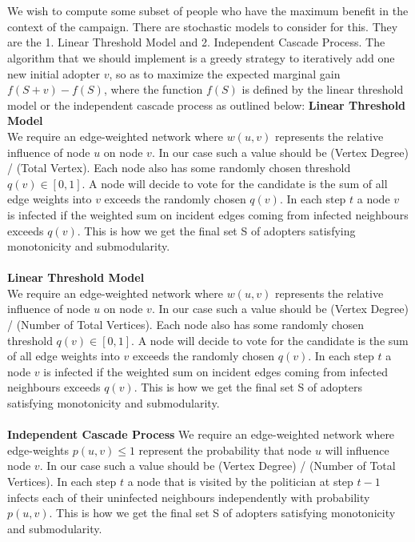 \documentclass[12pt]{article}
\begin{document}
\newpage
\section{}
We wish to compute some subset of people who have the maximum benefit in the context of the campaign. There are stochastic models to consider for this. They are the 1. Linear Threshold Model and 2. Independent Cascade Process. The algorithm that we should implement is a greedy strategy to iteratively add one new initial adopter $v$, so as to maximize the expected marginal gain $f(S+v) - f(S)$, where the function $f(S)$ is defined by the linear threshold model or the independent cascade process as outlined below:
\newline 
\newline 
\textbf{Linear Threshold Model}
\\
We require an edge-weighted network where $w(u,v)$ represents the relative influence of node $u$ on node $v$. In our case such a value should be (Vertex Degree) / (Total Vertex). Each node also has some randomly chosen threshold $q(v) \in [0,1]$. A node will decide to vote for the candidate is the sum of all edge weights into $v$ exceeds the randomly chosen $q(v)$. In each step $t$ a node $v$ is infected if the weighted sum on incident edges coming from infected neighbours exceeds $q(v)$. This is how we get the final set S of adopters satisfying monotonicity and submodularity. 
\\
\\
\textbf{Linear Threshold Model}
\\
We require an edge-weighted network where $w(u,v)$ represents the relative influence of node $u$ on node $v$. In our case such a value should be (Vertex Degree) / (Number of Total Vertices). Each node also has some randomly chosen threshold $q(v) \in [0,1]$. A node will decide to vote for the candidate is the sum of all edge weights into $v$ exceeds the randomly chosen $q(v)$. In each step $t$ a node $v$ is infected if the weighted sum on incident edges coming from infected neighbours exceeds $q(v)$. This is how we get the final set S of adopters satisfying monotonicity and submodularity. 
\\
\\
\textbf{Independent Cascade Process}
We require an edge-weighted network where edge-weights $p(u,v) \leq 1$ represent the probability that node $u$ will influence node $v$. In our case such a value should be (Vertex Degree) / (Number of Total Vertices). In each step $t$ a node that is visited by the politician at step $t-1$ infects each of their uninfected neighbours independently with probability $p(u,v)$. This is how we get the final set S of adopters satisfying monotonicity and submodularity. 
\end{document}
